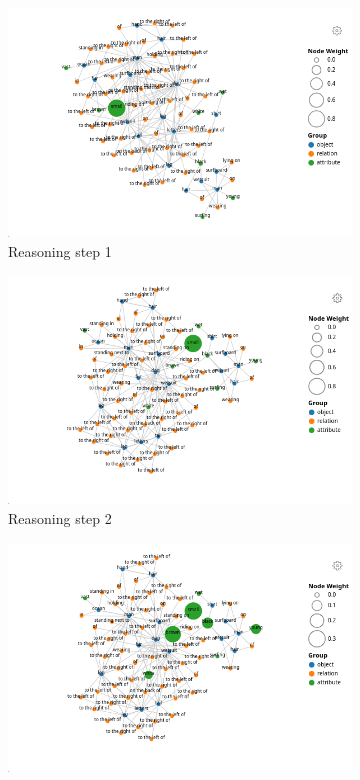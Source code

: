 \begin{figure}[htbp]
    \centering
    \begin{subfigure}[l]{0.49\textwidth}
        \includegraphics[width=\textwidth]{figures/positive_logical/positive_logical_read_attn_0.png}
        \caption{Reasoning step 1}
    \end{subfigure}
    \begin{subfigure}[r]{0.49\textwidth}
        \includegraphics[width=\textwidth]{figures/positive_logical/positive_logical_read_attn_1.png}
        \caption{Reasoning step 2}
    \end{subfigure}
    \begin{subfigure}[l]{0.49\textwidth}
        \includegraphics[width=\textwidth]{figures/positive_logical/positive_logical_read_attn_2.png}

\end{subfigure}
\end{figure}
